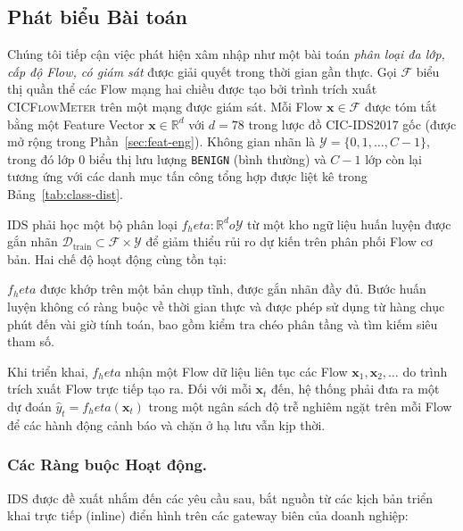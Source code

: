 \subsection{Phát biểu Bài toán}
\label{sec:problem-statement}

Chúng tôi tiếp cận việc phát hiện xâm nhập như một bài toán \emph{phân loại đa lớp, cấp độ Flow, có giám sát} được giải quyết trong thời gian gần thực. Gọi $\mathcal{F}$ biểu thị quần thể các Flow mạng hai chiều được tạo bởi trình trích xuất \textsc{CICFlowMeter} trên một mạng được giám sát. Mỗi Flow $\mathbf{x} \in \mathcal{F}$ được tóm tắt bằng một Feature Vector $\mathbf{x} \in \mathbb{R}^{d}$ với $d = 78$ trong lược đồ CIC-IDS2017 gốc (được mở rộng trong Phần~\ref{sec:feat-eng}). Không gian nhãn là $\mathcal{Y} = \{0, 1, \ldots, C{-}1\}$, trong đó lớp $0$ biểu thị lưu lượng \texttt{BENIGN} (bình thường) và $C{-}1$ lớp còn lại tương ứng với các danh mục tấn công tổng hợp được liệt kê trong Bảng~\ref{tab:class-dist}.

IDS phải học một bộ phân loại $f_	heta : \mathbb{R}^{d} 	o \mathcal{Y}$ từ một kho ngữ liệu huấn luyện được gắn nhãn $\mathcal{D}_{\text{train}} \subset \mathcal{F} \times \mathcal{Y}$ để giảm thiểu rủi ro dự kiến trên phân phối Flow cơ bản. Hai chế độ hoạt động cùng tồn tại:

\begin{description}[leftmargin=1.2em,itemsep=2pt,topsep=2pt]
    \item[Huấn luyện ngoại tuyến (Offline training).] $f_	heta$ được khớp trên một bản chụp tĩnh, được gắn nhãn đầy đủ. Bước huấn luyện không có ràng buộc về thời gian thực và được phép sử dụng từ hàng chục phút đến vài giờ tính toán, bao gồm kiểm tra chéo phân tầng và tìm kiếm siêu tham số.
    \item[Suy luận trực tuyến (Online inference).] Khi triển khai, $f_	heta$ nhận một Flow dữ liệu liên tục các Flow $\mathbf{x}_1, \mathbf{x}_2, \ldots$ do trình trích xuất Flow trực tiếp tạo ra. Đối với mỗi $\mathbf{x}_t$ đến, hệ thống phải đưa ra một dự đoán $\hat{y}_t = f_	heta(\mathbf{x}_t)$ trong một ngân sách độ trễ nghiêm ngặt trên mỗi Flow để các hành động cảnh báo và chặn ở hạ lưu vẫn kịp thời.
\end{description}

\subsubsection*{Các Ràng buộc Hoạt động.}
IDS được đề xuất nhắm đến các yêu cầu sau, bắt nguồn từ các kịch bản triển khai trực tiếp (inline) điển hình trên các gateway biên của doanh nghiệp:

